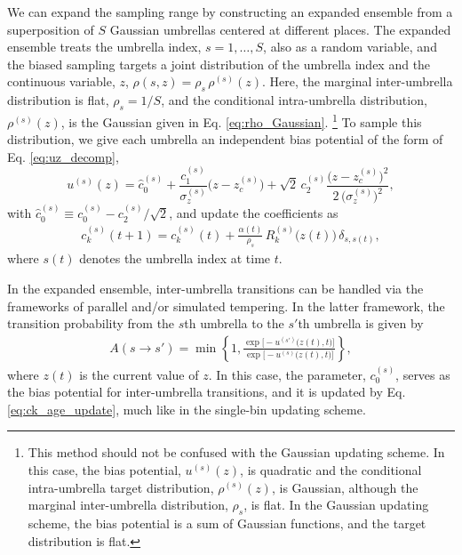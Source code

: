 \documentclass[preprint, superscriptaddress, floatfix]{revtex4-1}
\begin{document}
We can expand the sampling range
by constructing an expanded ensemble
from a superposition of $S$ Gaussian umbrellas
centered at different places.
%
The expanded ensemble treats
the umbrella index, $s = 1, \dots, S$,
also as a random variable,
and the biased sampling targets a joint distribution
of the umbrella index
and the continuous variable, $z$,
$\rho(s, z) = \rho_s \, \rho^{(s)}(z)$.
%
Here,
the marginal inter-umbrella distribution is flat,
$\rho_s = 1/S$,
and the conditional intra-umbrella distribution, $\rho^{(s)}(z)$,
is the Gaussian given in Eq. \eqref{eq:rho_Gaussian}.
\footnote{This method
  should not be confused with the Gaussian updating scheme.
  In this case, the bias potential, $u^{(s)}(z)$,
  is quadratic
  and the conditional intra-umbrella target distribution, $\rho^{(s)}(z)$,
  is Gaussian,
  although the marginal inter-umbrella distribution, $\rho_s$, is flat.
  In the Gaussian updating scheme, the bias potential is a sum of
  Gaussian functions, and the target distribution
  is flat.}
%
To sample this distribution, we give each umbrella
an independent bias potential of the form of Eq. \eqref{eq:uz_decomp},
%
\begin{equation}
  u^{(s)}(z)
  = \hat c_0^{(s)}
  + \frac{c_1^{(s)}}{\sigma_z^{(s)}} \bigl(z - z_c^{(s)}\bigr)
  + \sqrt 2 \, c_2^{(s)} \frac{\bigl(z-z_c^{(s)}\bigr)^2}
  {2 \, \bigl( \sigma_z^{(s)} \bigr)^2}
  ,
  \label{eq:u_age}
\end{equation}
%
with $\hat c_0^{(s)} \equiv c_0^{(s)} - c_2^{(s)}/\sqrt 2$,
and update the coefficients as
%
\begin{align}
  c_k^{(s)}(t+1) = c_k^{(s)}(t)
  + \frac{ \alpha(t) } { \rho_s } \, R_k^{(s)}\bigl( z(t) \bigr) \,
    \delta_{s, s(t)}
  ,
  \label{eq:ck_age_update}
\end{align}
%
where $s(t)$ denotes the umbrella index at time $t$.
%

In the expanded ensemble,
inter-umbrella transitions can be handled via the frameworks of
parallel\cite{swendsen1986,
  *geyer1991, *hukushima1996, *hansmann1997, *sugita1999,
  *earl2005, *zuckerman2011, *rauscher2009,
  neuhaus2006, *neuhaus2007, kim2010}
and/or simulated tempering\cite{marinari1992,
  *lyubartsev1992, li2007,
  park2007, *nguyen2013, *zhang2015st}.
%
In the latter framework,
the transition probability from
the $s$th umbrella to the $s'$th umbrella is given by
%
\begin{align}
A(s \to s') =
\min\left\{1,
  \frac{
    \exp\bigl[ - u^{(s')}\bigl( z(t), t \bigr) \bigr]
  }
  {
    \exp\bigl[ - u^{(s)}\bigl( z(t), t \bigr) \bigr]
  }
  \right\}
  ,
  \label{eq:transprob_st}
\end{align}
where $z(t)$ is the current value of $z$.
%
In this case,
the parameter, $c_0^{(s)}$,
serves as the bias potential
for inter-umbrella transitions,
and it is updated by Eq. \eqref{eq:ck_age_update},
much like in the single-bin updating scheme.\cite{li2007}
\end{document}
